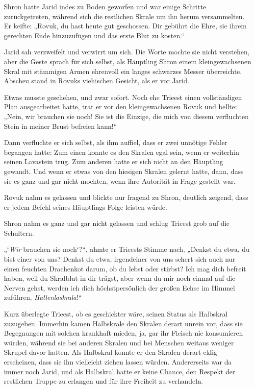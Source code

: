 Shron hatte Jarid indes zu Boden geworfen und war einige Schritte zurückgetreten, während sich die restlichen Skrale um ihn herum versammelten. Er keifte: „Rovuk, du hast heute gut geschossen. Dir gebührt die Ehre, sie ihrem gerechten Ende hinzuzufügen und das erste Blut zu kosten.“

Jarid sah verzweifelt und verwirrt um sich. Die Worte mochte sie nicht verstehen, aber die Geste sprach für sich selbst, als Häuptling Shron einem kleingewachsenen Skral mit stämmigen Armen ehrenvoll ein langes schwarzes Messer überreichte. Abscheu stand in Rovuks viehischen Gesicht, als er vor Jarid.

Etwas musste geschehen, und zwar sofort. Noch ehe Trieest einen vollständigen Plan ausgearbeitet hatte, trat er vor den kleingewachsenen Rovuk und bellte: „Nein, wir brauchen sie noch! Sie ist die Einzige, die mich von diesem verfluchten Stein in meiner Brust befreien kann!“

Dann verfluchte er sich selbst, als ihm auffiel, dass er zwei unnötige Fehler begangen hatte: Zum einen konnte es den Skralen egal sein, wenn er weiterhin seinen Lavastein trug. Zum anderen hatte er sich nicht an den Häuptling gewandt. Und wenn er etwas von den hiesigen Skralen gelernt hatte, dann, dass sie es ganz und gar nicht mochten, wenn ihre Autorität in Frage gestellt war.

Rovuk nahm es gelassen und blickte nur fragend zu Shron, deutlich zeigend, dass er jedem Befehl seines Häuptlings Folge leisten würde.

Shron nahm es ganz und gar nicht gelassen und schlug Trieest grob auf die Schultern.

„‘\textit{Wir} brauchen sie noch‘?“, ahmte er Trieests Stimme nach, „Denkst du etwa, du bist einer von uns? Denkst du etwa, irgendeiner von uns schert sich auch nur einen feuchten Drachenkot darum, ob du lebst oder stirbst? Ich mag dich befreit haben, weil du Skralblut in dir trägst, aber wenn du mir noch einmal auf die Nerven gehst, werden ich dich höchstpersönlich der großen Echse im Himmel zuführen, \textit{Hallenlaskrala}!“

Kurz überlegte Trieest, ob es geschickter wäre, seinen Status als Halbskral zuzugeben. Immerhin kamen Halbskrale den Skralen derart unrein vor, dass sie Begegnungen mit solchen krankhaft mieden, ja, gar ihr Fleisch nie konsumieren würden, während sie bei anderen Skralen und bei Menschen weitaus weniger Skrupel davor hatten. Als Halbskral konnte er den Skralen derart eklig erscheinen, dass sie ihn vielleicht ziehen lassen würden. Andererseits war da immer noch Jarid, und als Halbskral hatte er keine Chance, den Respekt der restlichen Truppe zu erlangen und für ihre Freiheit zu verhandeln.

